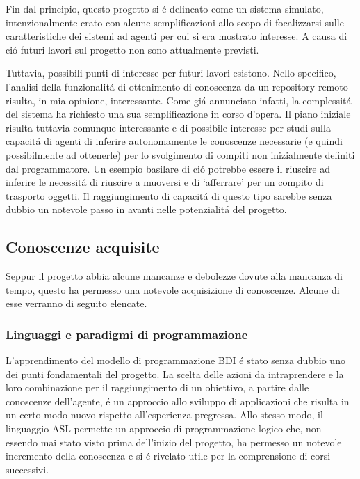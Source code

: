 Fin dal principio, questo progetto si \'e delineato come un sistema simulato, intenzionalmente crato con alcune semplificazioni allo scopo di focalizzarsi sulle caratteristiche dei sistemi ad agenti per cui si era mostrato interesse. A causa di ci\'o futuri lavori sul progetto non sono attualmente previsti.

\parag
Tuttavia, possibili punti di interesse per futuri lavori esistono. Nello specifico, l'analisi della funzionalit\'a di ottenimento di conoscenza da un repository remoto risulta, in mia opinione, interessante. Come gi\'a annunciato infatti, la complessit\'a del sistema ha richiesto una sua semplificazione in corso d'opera. Il piano iniziale risulta tuttavia comunque interessante e di possibile interesse per studi sulla capacit\'a di agenti di inferire autonomamente le conoscenze necessarie (e quindi possibilmente ad ottenerle) per lo svolgimento di compiti non inizialmente definiti dal programmatore. Un esempio basilare di ci\'o potrebbe essere il riuscire ad inferire le necessit\'a di riuscire a muoversi e di `afferrare' per un compito di trasporto oggetti. Il raggiungimento di capacit\'a di questo tipo sarebbe senza dubbio un notevole passo in avanti nelle potenzialit\'a del progetto.

\subsection{Conoscenze acquisite}

Seppur il progetto abbia alcune mancanze e debolezze dovute alla mancanza di tempo, questo ha permesso una notevole acquisizione di conoscenze. Alcune di esse verranno di seguito elencate.

\subsubsection{Linguaggi e paradigmi di programmazione}
L'apprendimento del modello di programmazione BDI \'e stato senza dubbio uno dei punti fondamentali del progetto. La scelta delle azioni da intraprendere e la loro combinazione per il raggiungimento di un obiettivo, a partire dalle conoscenze dell'agente, \'e un approccio allo sviluppo di applicazioni che risulta in un certo modo nuovo rispetto all'esperienza pregressa. Allo stesso modo, il linguaggio ASL permette un approccio di programmazione logico che, non essendo mai stato visto prima dell'inizio del progetto, ha permesso un notevole incremento della conoscenza e si \'e rivelato utile per la comprensione di corsi successivi.


